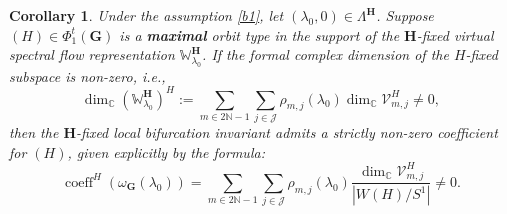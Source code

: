 \documentclass[twoside,11pt]{article}
\def\bc{{\mathbb{C}}}
\def\bn{{\mathbb{N}}}
\newtheorem{corollary}[theorem]{Corollary}
\begin{document}
\begin{corollary}\label{cor:spatiotemporal_guarantee}
Under the assumption \ref{b1}, let $(\lambda_0,0) \in\Lambda^{\bm H}$. Suppose $(H) \in \Phi_1^t(\bm{G})$ is a \textbf{maximal} orbit type in the support of the $\bm{H}$-fixed virtual spectral flow representation $\mathbb{W}_{\lambda_0}^{\bm{H}}$. If the formal complex dimension of the $H$-fixed subspace is non-zero, i.e.,
\begin{equation*}
\dim_\bc (\mathbb{W}_{\lambda_0}^{\bm{H}})^H := \sum_{m \in 2\bn-1} \sum_{j \in \mathcal{J}} \rho_{m,j}(\lambda_0) \dim_\bc \mathcal{V}_{m,j}^H \neq 0,
\end{equation*}
then the $\bm{H}$-fixed local bifurcation invariant admits a strictly non-zero coefficient for $(H)$, given explicitly by the formula:
\begin{equation*} 
\operatorname{coeff}^H(\omega_{\bm{G}}(\lambda_0)) = \sum_{m \in 2\bn-1} \sum_{j \in \mathcal{J}} \rho_{m,j}(\lambda_0) \frac{\dim_\bc \mathcal{V}_{m,j}^H}{|W(H)/S^1|} \neq 0.
\end{equation*}
\end{corollary}
\end{document}
